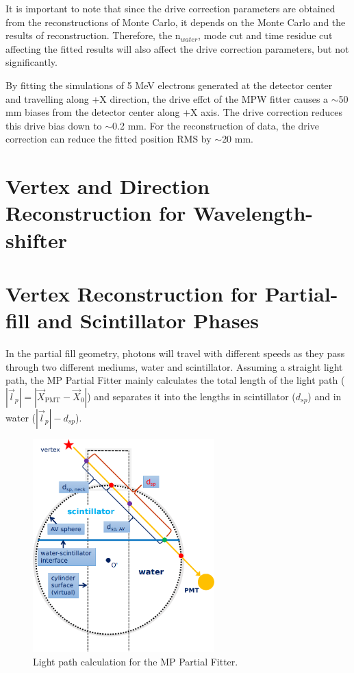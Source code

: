 It is important to note that since the drive correction parameters are obtained from the reconstructions of Monte Carlo, it depends on the Monte Carlo and the results of reconstruction. Therefore, the n$_{water}$, mode cut and time residue cut affecting the fitted results will also affect the drive correction parameters, but not significantly.

By fitting the simulations of 5 MeV electrons generated at the detector center and travelling along +X direction, the drive effct of the MPW fitter causes a $\sim$50 mm biases from the detector center along +X axis. The drive correction reduces this drive bias down to $\sim$0.2 mm. For the reconstruction of  data, the drive correction can reduce the fitted position RMS by $\sim$20 mm.





\section{Vertex and Direction Reconstruction for Wavelength-shifter}




\section{Vertex Reconstruction for Partial-fill and Scintillator Phases}

In the partial fill geometry, photons will travel with different speeds as they pass through two different mediums, water and scintillator. Assuming a straight light path, the MP Partial Fitter mainly calculates the total length of the light path ($|\vec{l}_p|=|\vec{X}_\mathrm{PMT}-\vec{X}_0|$) and separates it into the lengths in scintillator ($d_{sp}$) and in water ($|\vec{l}_p|-d_{sp}$).

\begin{figure}[!htb]
	\centering
	\includegraphics[width=7cm]{scintpath.png}
	\caption{Light path calculation for the MP Partial Fitter.}
	\label{scintpath}
\end{figure}

